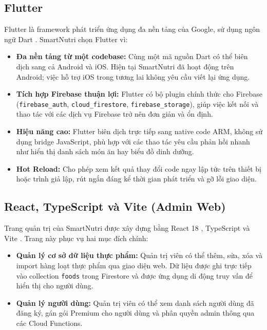 \subsection{Flutter}

Flutter \cite{flutter} là framework phát triển ứng dụng đa nền tảng của Google, sử dụng ngôn ngữ Dart \cite{dart}. SmartNutri chọn Flutter vì:

\begin{itemize}
    \item \textbf{Đa nền tảng từ một codebase:} Cùng một mã nguồn Dart có thể biên dịch sang cả Android và iOS. Hiện tại SmartNutri đã hoạt động trên Android; việc hỗ trợ iOS trong tương lai không yêu cầu viết lại ứng dụng.
    \item \textbf{Tích hợp Firebase thuận lợi:} Flutter có bộ plugin chính thức cho Firebase (\texttt{firebase\_auth}, \texttt{cloud\_firestore}, \texttt{firebase\_storage}), giúp việc kết nối và thao tác với các dịch vụ Firebase trở nên đơn giản và ổn định.
    \item \textbf{Hiệu năng cao:} Flutter biên dịch trực tiếp sang native code ARM, không sử dụng bridge JavaScript, phù hợp với các thao tác yêu cầu phản hồi nhanh như hiển thị danh sách món ăn hay biểu đồ dinh dưỡng.
    \item \textbf{Hot Reload:} Cho phép xem kết quả thay đổi code ngay lập tức trên thiết bị hoặc trình giả lập, rút ngắn đáng kể thời gian phát triển và gỡ lỗi giao diện.
\end{itemize}

\subsection{React, TypeScript và Vite (Admin Web)}

Trang quản trị của SmartNutri được xây dựng bằng React 18 \cite{react}, TypeScript \cite{typescript} và Vite \cite{vite}. Trang này phục vụ hai mục đích chính:

\begin{itemize}
    \item \textbf{Quản lý cơ sở dữ liệu thực phẩm:} Quản trị viên có thể thêm, sửa, xóa và import hàng loạt thực phẩm qua giao diện web. Dữ liệu được ghi trực tiếp vào collection \texttt{foods} trong Firestore và được ứng dụng di động truy vấn để hiển thị cho người dùng.
    \item \textbf{Quản lý người dùng:} Quản trị viên có thể xem danh sách người dùng đã đăng ký, gán gói Premium cho người dùng và phân quyền admin thông qua các Cloud Functions.
\end{itemize}

